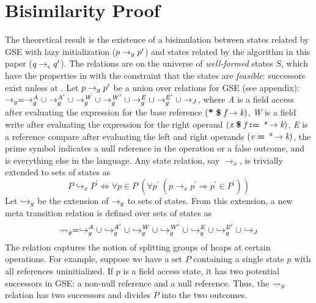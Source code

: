\section{Bisimilarity Proof}
\label{sec:bisim}
The theoretical result is the existence of a bisimulation between
states related by GSE with lazy initialization ($p \rightarrow_{g} p^\prime$)
and states related by the algorithm in this paper ($q \rightarrow_{\varsigma} q^\prime$). The relations are on the universe of \emph{well-formed} states $S$, which have the
properties in  with the constraint that
the states are \emph{feasible}: successors exist unless at
. Let $p \rightarrow_{g} p^\prime$ be a union over relations for GSE (see appendix):
$\rightarrow_{g} = \rightarrow_{g}^\mathit{A} \cup  \rightarrow_{g}^\mathit{A^\prime} \cup \rightarrow_{g}^\mathit{W} \cup \rightarrow_{g}^\mathit{W^\prime} \cup \rightarrow_{g}^\mathit{E} \cup \rightarrow_{g}^\mathit{E^\prime} \cup \rightarrow_{J}$, where \emph{A} is a field access after evaluating the expression for
the base reference $( \textbf{*}\ \textbf{\$}\ \emph{f} \rightarrow
\emph{k})$, \emph{W} is a field write after evaluating the
expression for the right operand $( \emph{x}\ \textbf{\$}\ \emph{f}\ \textbf{:=}\ \emph{*} \rightarrow
\emph{k})$, \emph{E} is a reference compare after evaluating the
left and right operands $\lp \cfgnt{v}\ \cfgt{=}\ \cfgnt{*}
\rightarrow \cfgnt{k}\rp$, the prime symbol indicates a null reference
in the operation or a false outcome, and \emph{\com} is everything
else in the language. Any state relation, say $\rightarrow_x$, is
trivially extended to sets of states as
$$
P \hookrightarrow_x P^\prime \Longleftrightarrow \forall p \in P\ (\forall p^\prime\ (p \rightarrow_x p^\prime \Rightarrow p^\prime \in P^\prime))
$$
Let $\hookrightarrow_{g}$ be the extension of $\rightarrow_{g}$ to sets of
states. From this extension, a new meta transition relation is defined
over sets of states as
$$
\leadsto_{g} = \hookrightarrow_{g}^\mathit{A}
\cup \hookrightarrow_{g}^\mathit{A^\prime} \cup \hookrightarrow_{g}^\mathit{W} \cup
\hookrightarrow_{g}^\mathit{W^\prime} \cup \hookrightarrow_{g}^\mathit{E} \cup \hookrightarrow_{g}^\mathit{E^\prime}
\cup \hookrightarrow_{J}
$$
The relation captures the notion of splitting groups of heaps at
certain operations. For example, suppose we have a set $P$ containing a single state $p$
with all references uninitialized. If $p$ is a field access state, it has two
potential successors in GSE: a non-null reference and a null reference. 
Thus, the $\leadsto_{g}$ relation has two successors and divides $P$ into the two outcomes.

